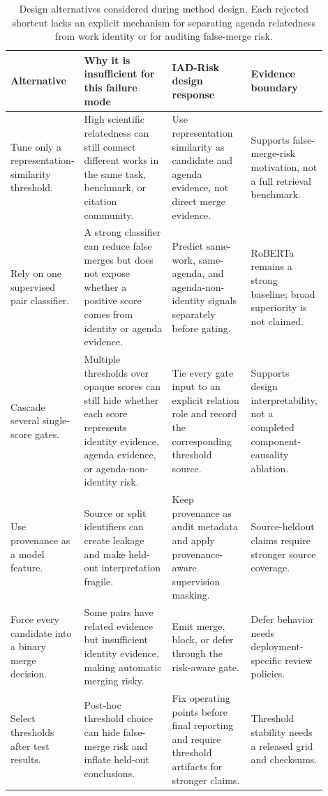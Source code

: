 \documentclass[11pt]{article}
\begin{document}
\begin{table}[H]
\caption{Design alternatives considered during method design. Each rejected shortcut lacks an explicit mechanism for separating agenda relatedness from work identity or for auditing false-merge risk.}
\label{tab:design-alternatives}
\centering
\footnotesize
\setlength{\tabcolsep}{3pt}
\begin{tabular}{L{0.22\linewidth}L{0.28\linewidth}L{0.25\linewidth}L{0.15\linewidth}}
\toprule
Alternative & Why it is insufficient for this failure mode & IAD-Risk design response & Evidence boundary \\
\midrule
Tune only a representation-similarity threshold. & High scientific relatedness can still connect different works in the same task, benchmark, or citation community. & Use representation similarity as candidate and agenda evidence, not direct merge evidence. & Supports false-merge-risk motivation, not a full retrieval benchmark. \\
Rely on one supervised pair classifier. & A strong classifier can reduce false merges but does not expose whether a positive score comes from identity or agenda evidence. & Predict same-work, same-agenda, and agenda-non-identity signals separately before gating. & RoBERTa remains a strong baseline; broad superiority is not claimed. \\
Cascade several single-score gates. & Multiple thresholds over opaque scores can still hide whether each score represents identity evidence, agenda evidence, or agenda-non-identity risk. & Tie every gate input to an explicit relation role and record the corresponding threshold source. & Supports design interpretability, not a completed component-causality ablation. \\
Use provenance as a model feature. & Source or split identifiers can create leakage and make held-out interpretation fragile. & Keep provenance as audit metadata and apply provenance-aware supervision masking. & Source-heldout claims require stronger source coverage. \\
Force every candidate into a binary merge decision. & Some pairs have related evidence but insufficient identity evidence, making automatic merging risky. & Emit merge, block, or defer through the risk-aware gate. & Defer behavior needs deployment-specific review policies. \\
Select thresholds after test results. & Post-hoc threshold choice can hide false-merge risk and inflate held-out conclusions. & Fix operating points before final reporting and require threshold artifacts for stronger claims. & Threshold stability needs a released grid and checksums. \\
\bottomrule
\end{tabular}
\end{table}
\end{document}
